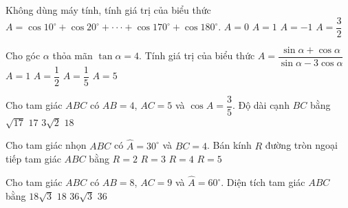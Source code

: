 \begin{ex}
	Không dùng máy tính, tính giá trị của biểu thức $A=\cos 10^\circ +\cos 20^\circ + \cdot \cdot \cdot +\cos 170^\circ +\cos 180^\circ $.
	\choice
	{$A=0$}
	{$A=1$}
	{\True $A=-1$}
	{$A=\dfrac{3}{2}$}
\end{ex}
\begin{ex}
	Cho góc $\alpha $ thỏa mãn $\tan \alpha =4$. Tính giá trị của biểu thức $A=\dfrac{\sin \alpha +\cos \alpha }{\sin \alpha -3\cos \alpha }$
	\choice
	{$A=1$}
	{$A=\dfrac{1}{2}$}
	{$A=\dfrac{1}{5}$}
	{\True $A=5$}
\end{ex}
\begin{ex}
	Cho tam giác $ABC$ có $AB=4$, $AC=5$ và $\cos A=\dfrac{3}{5}$. Độ dài cạnh $BC$ bằng
	\choice
	{\True $\sqrt{17}$}
	{$17$}
	{$3\sqrt{2}$}
	{$18$}
\end{ex}
\begin{ex}
	Cho tam giác nhọn $ABC$ có $\widehat{A}=30^\circ $ và $BC=4$. Bán kính $R$ đường tròn ngoại tiếp tam giác $ABC$ bằng
	\choice
	{$R=2$}
	{$R=3$}
	{\True $R=4$}
	{$R=5$}
\end{ex}
\begin{ex}
	Cho tam giác $ABC$ có $AB=8$, $AC=9$ và $\widehat{A}=60^\circ $. Diện tích tam giác $ABC$ bằng
	\choice
	{\True $18\sqrt{3}$}
	{$18$}
	{$36\sqrt{3}$}
	{$36$}
\end{ex}
